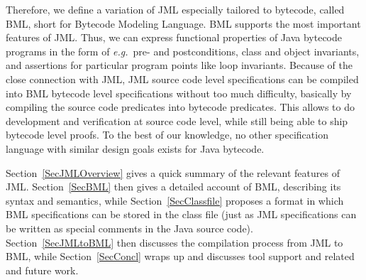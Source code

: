 Therefore, we define a variation of JML especially tailored to
bytecode, called BML, short for Bytecode Modeling Language.
BML supports the most important features of JML. Thus, we can express
functional properties of Java bytecode programs in the form of
\emph{e.g.}\ pre- and postconditions, class and object invariants, and
assertions for particular program points like loop invariants. Because
of the close connection with JML, JML source code level specifications
can be compiled into BML bytecode level specifications without too
much difficulty, basically by compiling the source code predicates
into bytecode predicates.  This allows to do development and
verification at source code level, while still being able to ship
bytecode level proofs.  To the best of our knowledge, no other
specification language with similar design goals exists for Java
bytecode.

Section~\ref{SecJMLOverview} gives a quick summary of the relevant
features of JML. Section~\ref{SecBML} then gives a detailed account of
BML, describing its syntax and semantics, while
Section~\ref{SecClassfile} proposes a format in which BML
specifications can be stored in the class file (just as JML
specifications can be written as special comments in the Java source
code). Section~\ref{SecJMLtoBML} then discusses the compilation
process from JML to BML, while Section~\ref{SecConcl} wraps up and
discusses tool support and related and future work.



